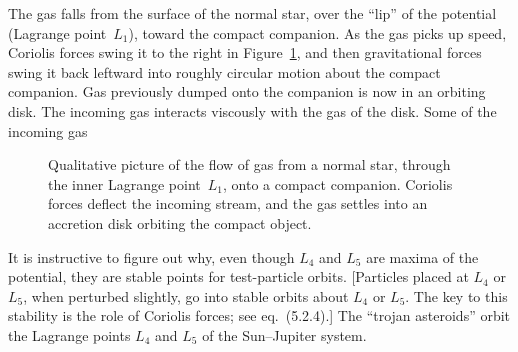 The gas falls from the surface of the normal star, over the ``lip'' of the
potential (Lagrange point~$L_1$), toward the compact companion.  As the gas
picks up speed, Coriolis forces swing it to the right in
Figure~\ref{fig:5.2.2}, and then gravitational forces swing it back leftward
into roughly circular motion about the compact companion.  Gas previously
dumped onto the companion is now in an orbiting disk.  The incoming gas
interacts viscously with the gas of the disk.  Some of the incoming gas

\begin{figure}[htbp]
\centering
\caption{Qualitative picture of the flow of gas from a normal star,
through the inner Lagrange point~$L_1$, onto a compact companion.
Coriolis forces deflect the incoming stream, and the gas settles into an
accretion disk orbiting the compact object.}
\label{fig:5.2.2}
\end{figure}

It is instructive to figure out why, even though $L_4$ and $L_5$ are maxima
of the potential, they are stable points for test-particle orbits.
[Particles placed at $L_4$ or $L_5$, when perturbed slightly, go into
stable orbits about $L_4$ or $L_5$.  The key to this stability is the role
of Coriolis forces; see eq.~(5.2.4).]  The ``trojan asteroids'' orbit the
Lagrange points $L_4$ and $L_5$ of the Sun--Jupiter system.
